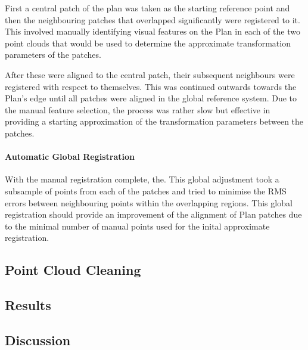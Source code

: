 		First a central patch of the plan was taken as the starting reference point and then the neighbouring patches that overlapped significantly were registered to it. This involved manually identifying visual features on the Plan in each of the two point clouds that would be used to determine the approximate transformation parameters of the patches.
		
		After these were aligned to the central patch, their subsequent neighbours were registered with respect to themselves. This was continued outwards towards the Plan's edge until all patches were aligned in the global reference system. Due to the manual feature selection, the process was rather slow but effective in providing a starting approximation of the transformation parameters between the patches.
	
		\paragraph{Automatic Global Registration}
		With the manual registration complete, the. This global adjustment took a subsample of points from each of the patches and tried to minimise the RMS errors between neighbouring points within the overlapping regions. This global registration should provide an improvement of the alignment of Plan patches due to the minimal number of manual points used for the inital approximate registration.
	
	\subsection{Point Cloud Cleaning}
	
	\subsection{Results}
	
	\subsection{Discussion}